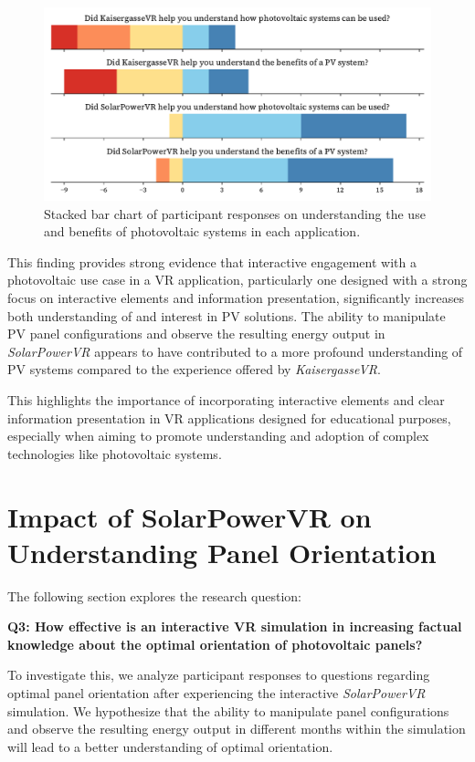 \documentclass[draft, final]{vutinfth} %
\begin{document}
\begin{figure}[h]
    \centering
    \includegraphics[width=\textwidth]{graphics/research-2.pdf}
    \caption{Stacked bar chart of participant responses on understanding the use and benefits of photovoltaic systems in each application.}
    \label{fig:research-2}
\end{figure}

This finding provides strong evidence that interactive engagement with a photovoltaic use case in a VR application, particularly one designed with a strong focus on interactive elements and information presentation, significantly increases both understanding of and interest in PV solutions. The ability to manipulate PV panel configurations and observe the resulting energy output in \textit{SolarPowerVR} appears to have contributed to a more profound understanding of PV systems compared to the experience offered by \textit{KaisergasseVR}.

This highlights the importance of incorporating interactive elements and clear information presentation in VR applications designed for educational purposes, especially when aiming to promote understanding and adoption of complex technologies like photovoltaic systems.

\section{Impact of SolarPowerVR on Understanding Panel Orientation}

The following section explores the research question:

\textbf{Q3: How effective is an interactive VR simulation in increasing factual knowledge about the optimal orientation of photovoltaic panels?}

To investigate this, we analyze participant responses to questions regarding optimal panel orientation after experiencing the interactive \textit{SolarPowerVR} simulation. We hypothesize that the ability to manipulate panel configurations and observe the resulting energy output in different months within the simulation will lead to a better understanding of optimal orientation.
\end{document}
